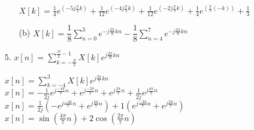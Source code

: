 \documentclass{article}
\begin{document}
\begin{enumerate}
\begin{enumerate}
			$X\left[k\right] = \frac{1}{4}e^{\left( -5j \frac{\pi}{3}k\right)} + \frac{1}{12}e^{\left( -4j \frac{\pi}{3}k\right)} + \frac{1}{12}e^{\left( -2j \frac{\pi}{3}k\right)} + \frac{1}{4}e^{\left(\frac{\pi}{3}\left(-k\right)\right)} + \frac{1}{3}$\\
			
	\item[(b)]
			$X\left[k\right] = \dfrac{1}{8} \displaystyle\sum_{n=0}^{3}e^{-j\frac{2\pi}{8}kn} - \dfrac{1}{8} \displaystyle\sum_{n=4}^{7}e^{-j\frac{2\pi}{8}kn}$\\
	\end{enumerate}

\newpage

\item[5.]
	$x\left[n\right] = \displaystyle\sum_{k=-\frac{N}{2}}^{\frac{N}{2}-1} X\left[k\right]e^{j\frac{2\pi}{N}kn}$
	
	$x\left[n\right] = \displaystyle\sum_{k=-4}^{3} X\left[k\right]e^{j\frac{2\pi}{7}kn}$\\
	
	$x\left[n\right] = -\frac{1}{2j}e^{j\frac{-4\pi}{7}n} + e^{j\frac{-2\pi}{7}n} + e^{j\frac{2\pi}{7}n} + \frac{1}{2j}e^{j\frac{4\pi}{7}n}$\\
	
	$x\left[n\right] = \frac{1}{2j}\left(-e^{j\frac{-4\pi}{7}n} + e^{j\frac{4\pi}{7}n}\right) + 1\left(e^{j\frac{-2\pi}{7}n} + e^{j\frac{2\pi}{7}n}\right)$\\
	
	$x\left[n\right] = \sin\left(\frac{4\pi}{7}n\right) + 2\cos\left(\frac{2\pi}{7}n\right)$

\end{enumerate}
\end{document}
